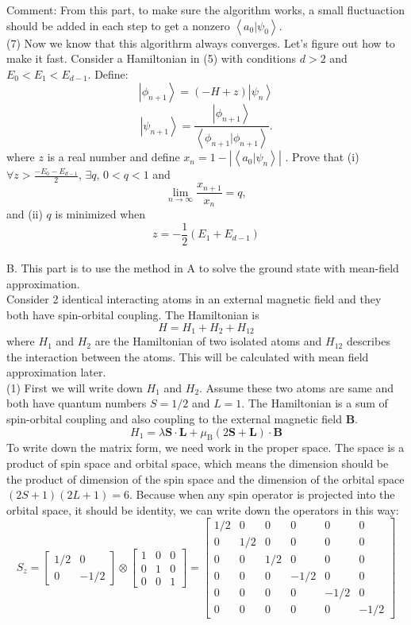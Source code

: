 \documentclass[letter]{article}
\begin{document}
\indent Comment: From this part, to make sure the algorithm works, a small fluctuaction should be added in each step to get a nonzero $\left<a_0|\psi_0\right>$.\\
\indent (7) Now we know that this algorithrm always converges. Let's figure out how to make it fast. Consider a Hamiltonian in (5) with conditions $d>2$ and $E_0<E_1<E_{d-1}$. Define:$$\left|\phi_{n+1}\right>=\left(-H+z\right) \left|\psi_n\right>$$
$$\left|\psi_{n+1}\right>=\frac{\left|\phi_{n+1}\right>}{\left<\phi_{n+1}|\phi_{n+1}\right>}.$$
where $z$ is a real number and define $x_n=1-\left|\left<a_0|\psi_n\right>\right|$
. Prove that (i) $\forall z >\frac{-E_0-E_{d-1}}{2}$, $\exists q$, $0< q <1$ and $$
\lim _{n\rightarrow \infty} \frac{x_{n+1}}{x_n}=q,
$$
and (ii) $q$ is minimized when $$z=-\frac{1}{2}\left(E_1+E_{d-1}\right)$$\\
B. This part is to use the method in A to solve the ground state with mean-field approximation. \\
\indent Consider 2 identical interacting atoms in an external magnetic field and they both have spin-orbital coupling. The Hamiltonian is 
$$
H=H_1+H_2+H_{12}
$$
where $H_1$ and $H_2$ are the Hamiltonian of two isolated atoms and $H_{12}$ describes the interaction between the atoms. This will be calculated with mean field approximation later. \\
\indent (1) First we will write down $H_{1}$ and $H_2$. Assume these two atoms are same and both have quantum numbers $S=1/2$ and $L=1$. The Hamiltonian is a sum of spin-orbital coupling and also coupling to the external magnetic field $\bm{B}$.
$$H_1=\lambda \bm{S}\cdot\bm{L}+\mu_{\mathrm{B}}(2\bm{S}+\bm{L})\cdot\bm{B}
$$
To write down the matrix form, we need work in the proper space. The space is a product of spin space and orbital space, which means the dimension should be the product of dimension of the spin space and the dimension of the orbital space $(2S+1)(2L+1)=6$. Because when any spin operator is projected into the orbital space, it should be identity, we can write down the operators in this way:
$$S_z=\begin{bmatrix}
1/2 & 0\\
0 & -1/2
\end{bmatrix} \otimes \begin{bmatrix}
1 &0 &0\\
0 & 1 & 0 \\
0 &0 &1
\end{bmatrix}=\begin{bmatrix}
1/2 &0 &0 &0 &0 &0\\
0 &1/2 &0 &0 &0 &0\\
0 &0 &1/2 &0 &0 &0\\
0 &0 &0 &-1/2 &0 &0\\
0 &0 &0 &0 &-1/2 &0\\
0 &0 &0 &0 &0 &-1/2
\end{bmatrix}
$$
\end{document}
